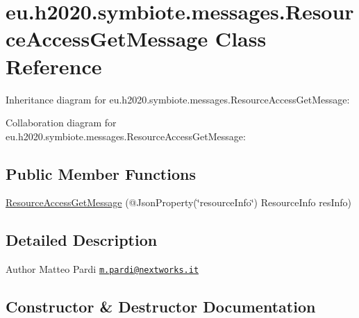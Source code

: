 \hypertarget{classeu_1_1h2020_1_1symbiote_1_1messages_1_1ResourceAccessGetMessage}{}\section{eu.\+h2020.\+symbiote.\+messages.\+Resource\+Access\+Get\+Message Class Reference}
\label{classeu_1_1h2020_1_1symbiote_1_1messages_1_1ResourceAccessGetMessage}


Inheritance diagram for eu.\+h2020.\+symbiote.\+messages.\+Resource\+Access\+Get\+Message\+:


Collaboration diagram for eu.\+h2020.\+symbiote.\+messages.\+Resource\+Access\+Get\+Message\+:
\subsection*{Public Member Functions}
\begin{DoxyCompactItemize}
\item 
\hyperlink{classeu_1_1h2020_1_1symbiote_1_1messages_1_1ResourceAccessGetMessage_ad4e133b15feaef786cc954d24a1db12f}{Resource\+Access\+Get\+Message} (@Json\+Property(\char`\"{}resource\+Info\char`\"{}) Resource\+Info res\+Info)
\end{DoxyCompactItemize}


\subsection{Detailed Description}
\begin{DoxyAuthor}{Author}
Matteo Pardi \href{mailto:m.pardi@nextworks.it}{\tt m.\+pardi@nextworks.\+it} 
\end{DoxyAuthor}


\subsection{Constructor \& Destructor Documentation}
\mbox{\label{classeu_1_1h2020_1_1symbiote_1_1messages_1_1ResourceAccessGetMessage_ad4e133b15feaef786cc954d24a1db12f}} 
